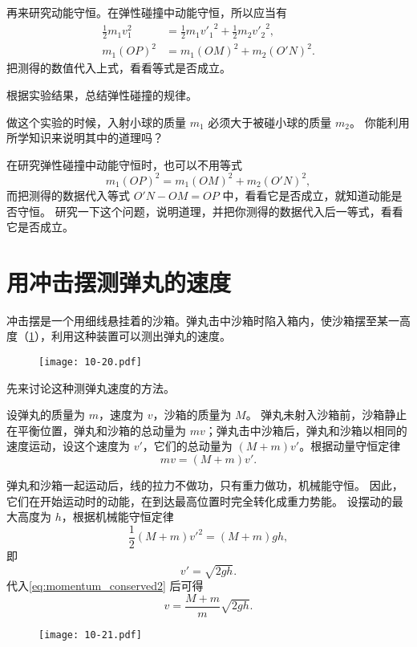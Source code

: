 再来研究动能守恒。在弹性碰撞中动能守恒，所以应当有
\[\begin{split}
    \frac{1}{2}m_1v_1^2&=\frac{1}{2}m_1{v'_1}^2+\frac{1}{2}m_2{v'_2}^2,\\
    m_1(OP)^2&=m_1(OM)^2+m_2(O'N)^2.
\end{split}\]
把测得的数值代入上式，看看等式是否成立。

根据实验结果，总结弹性碰撞的规律。

做这个实验的时候，入射小球的质量 $m_1$ 必须大于被碰小球的质量 $m_2$。
你能利用所学知识来说明其中的道理吗？

在研究弹性碰撞中动能守恒时，也可以不用等式
\[m_1(OP)^2=m_1(OM)^2+m_2(O'N)^2,\]
而把测得的数据代入等式 $O'N-OM=OP$ 中，看看它是否成立，就知道动能是否守恒。
研究一下这个问题，说明道理，并把你测得的数据代入后一等式，看看它是否成立。

\section{用冲击摆测弹丸的速度}
冲击摆是一个用细线悬挂着的沙箱。弹丸击中沙箱时陷入箱内，使沙箱摆至某一高度（\cref{fig:10-20}），利用这种装置可以测出弹丸的速度。

\begin{figure}
  \texttt{[image: 10-20.pdf]}
  \caption{}\label{fig:10-20}
\end{figure}

先来讨论这种测弹丸速度的方法。

设弹丸的质量为 $m$，速度为 $v$，沙箱的质量为 $M$。
弹丸未射入沙箱前，沙箱静止在平衡位置，弹丸和沙箱的总动量为 $mv$；弹丸击中沙箱后，弹丸和沙箱以相同的速度运动，设这个速度为 $v'$，它们的总动量为 $(M+m)v'$。根据动量守恒定律
\begin{equation}
  \label{eq:momentum_conserved2}
  mv=(M+m)v'.
\end{equation}

弹丸和沙箱一起运动后，线的拉力不做功，只有重力做功，机械能守恒。
因此，它们在开始运动时的动能，在到达最高位置时完全转化成重力势能。
设摆动的最大高度为 $h$，根据机械能守恒定律
\begin{equation}
  \frac{1}{2}(M+m){v'}^2 =(M+m)gh,
\end{equation}
即
\[v'=\sqrt{2gh}.\]
代入\cref{eq:momentum_conserved2} 后可得
\begin{equation}
  \label{eq:bullet_velocity}
v=\frac{M+m}{m}\sqrt{2gh}.
\end{equation}

\begin{figure}
  \texttt{[image: 10-21.pdf]}
  \caption{}\label{fig:10-21}
\end{figure}

